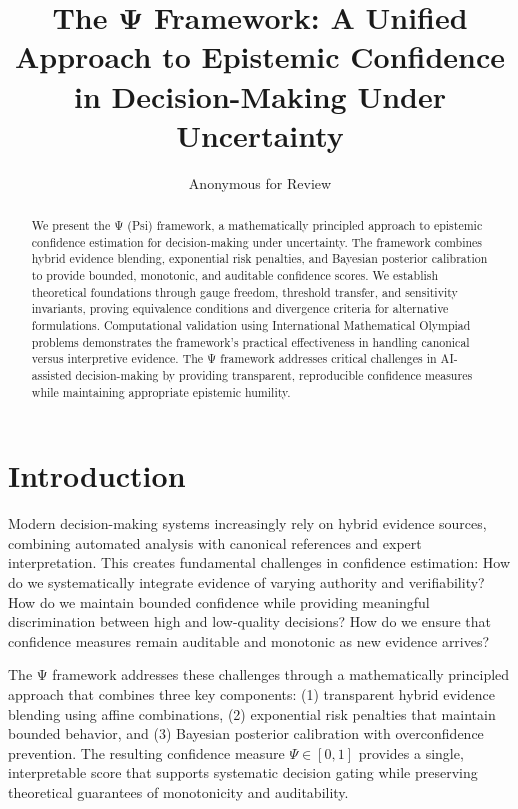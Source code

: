 \documentclass[12pt,a4paper]{article}
\title{The Ψ Framework: A Unified Approach to Epistemic Confidence\\
in Decision-Making Under Uncertainty}
\author{Anonymous for Review}
\date{}
\newcommand{\score}{\Psi}
\begin{document}
\maketitle

\begin{abstract}
We present the Ψ (Psi) framework, a mathematically principled approach to epistemic confidence estimation for decision-making under uncertainty. The framework combines hybrid evidence blending, exponential risk penalties, and Bayesian posterior calibration to provide bounded, monotonic, and auditable confidence scores. We establish theoretical foundations through gauge freedom, threshold transfer, and sensitivity invariants, proving equivalence conditions and divergence criteria for alternative formulations. Computational validation using International Mathematical Olympiad problems demonstrates the framework's practical effectiveness in handling canonical versus interpretive evidence. The Ψ framework addresses critical challenges in AI-assisted decision-making by providing transparent, reproducible confidence measures while maintaining appropriate epistemic humility.
\end{abstract}

\section{Introduction}

Modern decision-making systems increasingly rely on hybrid evidence sources, combining automated analysis with canonical references and expert interpretation. This creates fundamental challenges in confidence estimation: How do we systematically integrate evidence of varying authority and verifiability? How do we maintain bounded confidence while providing meaningful discrimination between high and low-quality decisions? How do we ensure that confidence measures remain auditable and monotonic as new evidence arrives?

The Ψ framework addresses these challenges through a mathematically principled approach that combines three key components: (1) transparent hybrid evidence blending using affine combinations, (2) exponential risk penalties that maintain bounded behavior, and (3) Bayesian posterior calibration with overconfidence prevention. The resulting confidence measure $\score \in [0,1]$ provides a single, interpretable score that supports systematic decision gating while preserving theoretical guarantees of monotonicity and auditability.
\end{document}
